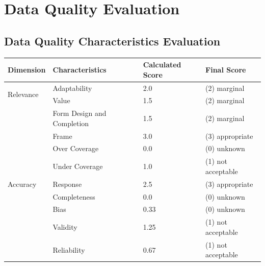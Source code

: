 \section{Data Quality Evaluation}

\subsection{Data Quality Characteristics Evaluation}

\begin{table}[htbp]
    \centering

    \begin{tabular}{llll}
        \toprule
        Dimension                           & Characteristics               & Calculated Score  & Final Score           \\ \midrule
        \multirow{2}{*}{Relevance}          & Adaptability                  & 2.0               & (2) marginal          \\
                                            & Value                         & 1.5               & (2) marginal          \\ \midrule
        \multirow{13}{*}{Accuracy}          & Form Design and Completion    & 1.5               & (2) marginal          \\
                                            & Frame                         & 3.0               & (3) appropriate       \\
                                            & Over Coverage                 & 0.0               & (0) unknown           \\
                                            & Under Coverage                & 1.0               & (1) not acceptable    \\
                                            & Response                      & 2.5               & (3) appropriate       \\
                                            & Completeness                  & 0.0               & (0) unknown           \\
                                            & Bias                          & 0.33              & (0) unknown           \\
                                            & Validity                      & 1.25              & (1) not acceptable    \\
                                            & Reliability                   & 0.67              & (1) not acceptable    \\

\end{tabular}
\end{table}
